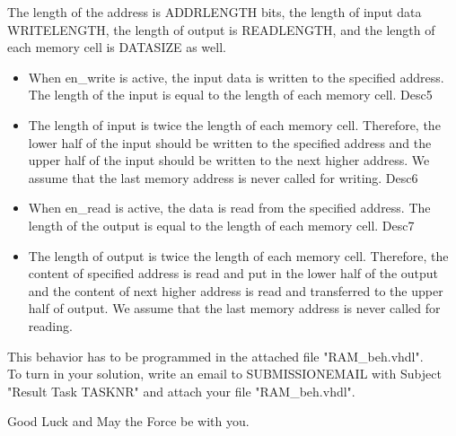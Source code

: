 \documentclass[a4paper,12pt]{article}
\begin{document}
 The length of the address is {{ADDRLENGTH}} bits, the length of input data {{WRITELENGTH}}, the length of output is {{READLENGTH}}, and the length of each memory cell is {{DATASIZE}} as well.
\begin{itemize}
{{Desc4}}\item When en\_write is active, the input data is written to the specified address. The length of the input is equal to the length of each memory cell.
{{Desc5}}\item The length of input is twice the length of each memory cell. Therefore, the lower half of the input should be written to the specified address and the upper half of the input should be written to the next higher address. We assume that the last memory address is never called for writing.
{{Desc6}}\item When en\_read is active, the data is read from the specified address. The length of the output is equal to the length of each memory cell.
{{Desc7}}\item The length of output is twice the length of each memory cell. Therefore, the content of specified address is read and put in the lower half of the output and the content of next higher address is read and transferred to the upper half of output. We assume that the last memory address is never called for reading.
\end{itemize}

This behavior has to be programmed in the attached file "RAM\_beh.vhdl".
\\

To turn in your solution, write an email to {{SUBMISSIONEMAIL}} with Subject "Result Task {{TASKNR}}" and attach your file "RAM\_beh.vhdl".

\vspace{0.7cm}
Good Luck and May the Force be with you.
\end{document}
